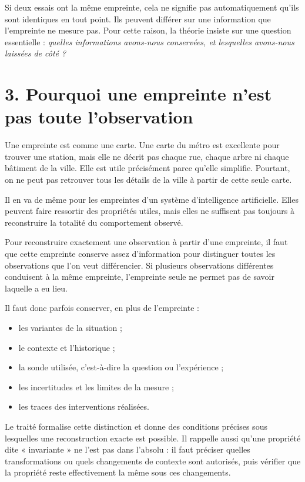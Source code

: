\documentclass[11pt,a4paper]{article}
\begin{document}
Si deux essais ont la même empreinte, cela ne signifie pas automatiquement qu'ils sont identiques en tout point. Ils peuvent différer sur une information que l'empreinte ne mesure pas. Pour cette raison, la théorie insiste sur une question essentielle : \emph{quelles informations avons-nous conservées, et lesquelles avons-nous laissées de côté ?}

\section*{3. Pourquoi une empreinte n'est pas toute l'observation}

Une empreinte est comme une carte. Une carte du métro est excellente pour trouver une station, mais elle ne décrit pas chaque rue, chaque arbre ni chaque bâtiment de la ville. Elle est utile précisément parce qu'elle simplifie. Pourtant, on ne peut pas retrouver tous les détails de la ville à partir de cette seule carte.

Il en va de même pour les empreintes d'un système d'intelligence artificielle. Elles peuvent faire ressortir des propriétés utiles, mais elles ne suffisent pas toujours à reconstruire la totalité du comportement observé.

Pour reconstruire exactement une observation à partir d'une empreinte, il faut que cette empreinte conserve assez d'information pour distinguer toutes les observations que l'on veut différencier. Si plusieurs observations différentes conduisent à la même empreinte, l'empreinte seule ne permet pas de savoir laquelle a eu lieu.

Il faut donc parfois conserver, en plus de l'empreinte :
\begin{itemize}[leftmargin=1.4em]
  \item les variantes de la situation ;
  \item le contexte et l'historique ;
  \item la sonde utilisée, c'est-à-dire la question ou l'expérience ;
  \item les incertitudes et les limites de la mesure ;
  \item les traces des interventions réalisées.
\end{itemize}

Le traité formalise cette distinction et donne des conditions précises sous lesquelles une reconstruction exacte est possible. Il rappelle aussi qu'une propriété dite « invariante » ne l'est pas dans l'absolu : il faut préciser quelles transformations ou quels changements de contexte sont autorisés, puis vérifier que la propriété reste effectivement la même sous ces changements.
\end{document}
